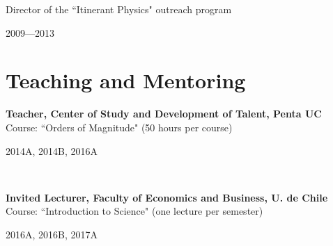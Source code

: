 \documentclass[11pt, a4paper]{article} %
\begin{document}

\begin{minipage}[t]{0.7\textwidth}
\begin{flushleft}%
  \setlength{\leftskip}{0.2cm}%
Director of the ``Itinerant Physics" outreach program
\end{flushleft}
\end{minipage}
\begin{minipage}[t]{0.3\textwidth}
\hfill 2009---2013
\end{minipage}

\section*{Teaching and Mentoring}

\begin{minipage}[t]{0.7\textwidth}
\begin{flushleft}%
  \setlength{\leftskip}{0.2cm}%
\textbf{Teacher, Center of Study and Development of Talent, Penta UC}\\
Course: ``Orders of Magnitude" (50 hours per course)
\end{flushleft}
\end{minipage}
\begin{minipage}[t]{0.3\textwidth}
\hfill 2014A, 2014B, 2016A
\end{minipage}\\

\begin{minipage}[t]{0.7\textwidth}
\begin{flushleft}%
  \setlength{\leftskip}{0.2cm}%
\textbf{Invited Lecturer, Faculty of Economics and Business, U. de Chile}\\
Course: ``Introduction to Science" (one lecture per semester)
\end{flushleft}
\end{minipage}
\begin{minipage}[t]{0.3\textwidth}
\hfill 2016A, 2016B, 2017A
\end{minipage}
\end{document}
